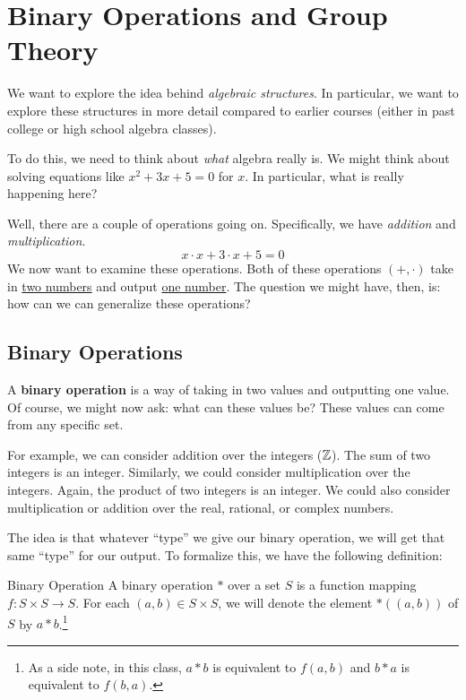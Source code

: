 \documentclass[letterpaper]{article}
\begin{document}




\newpage 
\section{Binary Operations and Group Theory}
We want to explore the idea behind \emph{algebraic structures}. In particular, we want to explore these structures in more detail compared to earlier courses (either in past college or high school algebra classes).

\bigskip 

To do this, we need to think about \emph{what} algebra really is. We might think about solving equations like $x^2 + 3x + 5 = 0$ for $x$. In particular, what is really happening here?

\bigskip 

Well, there are a couple of operations going on. Specifically, we have \emph{addition} and \emph{multiplication}. 
\[x \cdot x + 3 \cdot x + 5 = 0\]
We now want to examine these operations. Both of these operations $(+, \cdot)$ take in \underline{two numbers} and output \underline{one number}. The question we might have, then, is: how can we can generalize these operations?

\subsection{Binary Operations}
A \textbf{binary operation} is a way of taking in two values and outputting one value. Of course, we might now ask: what can these values be? These values can come from any specific set. 

\bigskip 

For example, we can consider addition over the integers ($\mathbb{Z}$). The sum of two integers is an integer. Similarly, we could consider multiplication over the integers. Again, the product of two integers is an integer. We could also consider multiplication or addition over the real, rational, or complex numbers. 

\bigskip 

The idea is that whatever ``type'' we give our binary operation, we will get that same ``type'' for our output. To formalize this, we have the following definition:  
\begin{definition}{Binary Operation}{}
    A binary operation $*$ over a set $S$ is a function mapping $f: S \times S \to S$. For each $(a, b) \in S \times S$, we will denote the element $*((a, b))$ of $S$ by $a * b$.\footnote{As a side note, in this class, $a * b$ is equivalent to $f(a, b)$ and $b * a$ is equivalent to $f(b, a)$.}
\end{definition}
\end{document}
